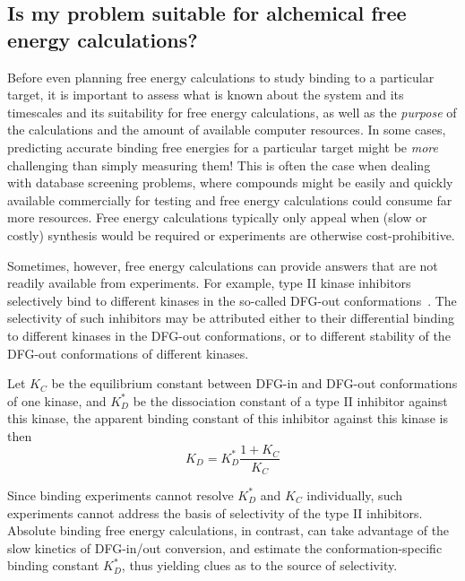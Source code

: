 \documentclass[9pt,bestpractices]{livecoms}
\begin{document}
\subsection{Is my problem suitable for alchemical free energy calculations?}
\label{subsec:suitability}
Before even planning free energy calculations to study binding to a
particular target, it is important to assess what is known about the
system and its timescales and its suitability for free energy
calculations, as well as the \emph{purpose} of the calculations and
the amount of available computer resources. In some cases, predicting accurate binding free energies for a particular target might be
\emph{more} challenging than simply measuring them! This is
often the case when dealing with database screening problems, where
compounds might be easily and quickly available commercially for
testing and free energy calculations could consume far more resources. Free energy calculations typically only
appeal when (slow or costly) synthesis would be required or experiments are otherwise cost-prohibitive.

Sometimes, however, free energy calculations can provide answers that are not
readily available from experiments. For example, type II kinase
inhibitors selectively bind to different kinases in the so-called
DFG-out conformations~\cite{schindler2000structural}. The selectivity of such
inhibitors may be attributed either to their differential binding to
different kinases in the DFG-out conformations, or to different
stability of the DFG-out conformations of different kinases. 

Let
$K_C$ be the equilibrium constant between DFG-in and DFG-out
conformations of one kinase, and $K_D^\ast$ be the dissociation
constant of a type II inhibitor against this kinase, the apparent
binding constant of this inhibitor against this kinase is then
\begin{equation}
  K_D = K_D^\ast \frac{1 + K_C}{K_C}
  \label{eqn:conformational-binding}
\end{equation}

Since binding experiments cannot resolve $K_D^\ast$ and $K_C$ individually, such experiments cannot address the basis of selectivity of the type II inhibitors. Absolute binding free energy calculations, in contrast, can take advantage of the slow kinetics of DFG-in/out conversion, and estimate the conformation-specific binding constant $K_D^\ast$, thus yielding clues as to the source of selectivity.

%
%
\end{document}
